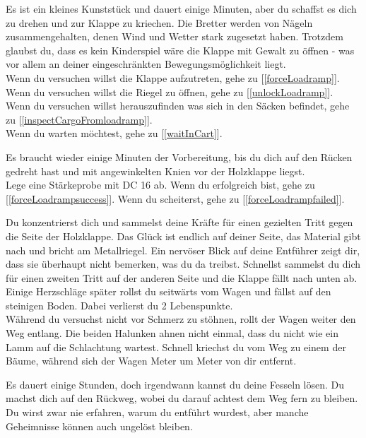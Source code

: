 
Es ist ein kleines Kunststück und dauert einige Minuten, aber du schaffst es dich zu drehen und zur Klappe zu kriechen. Die Bretter werden von Nägeln zusammengehalten, denen Wind und Wetter stark zugesetzt haben. Trotzdem glaubst du, dass es kein Kinderspiel wäre die Klappe mit Gewalt zu öffnen - was vor allem an deiner eingeschränkten Bewegungsmöglichkeit liegt.
\\Wenn du versuchen willst die Klappe aufzutreten, gehe zu [\ref{forceLoadramp}].
\\Wenn du versuchen willst die Riegel zu öffnen, gehe zu [\ref{unlockLoadramp}].
\\Wenn du versuchen willst herauszufinden was sich in den Säcken befindet, gehe zu [\ref{inspectCargoFromloadramp}].
\\Wenn du warten möchtest, gehe zu [\ref{waitInCart}].


Es braucht wieder einige Minuten der Vorbereitung, bis du dich auf den Rücken gedreht hast und mit angewinkelten Knien vor der Holzklappe liegst.\\
Lege eine Stärkeprobe mit DC 16 ab. Wenn du erfolgreich bist, gehe zu [\ref{forceLoadrampsuccess}].
Wenn du scheiterst, gehe zu [\ref{forceLoadrampfailed}].


Du konzentrierst dich und sammelst deine Kräfte für einen gezielten Tritt gegen die Seite der Holzklappe. Das Glück ist endlich auf deiner Seite, das Material gibt nach und bricht am Metallriegel. Ein nervöser Blick auf deine Entführer zeigt dir, dass sie überhaupt nicht bemerken, was du da treibst. Schnellst sammelst du dich für einen zweiten Tritt auf der anderen Seite und die Klappe fällt nach unten ab. Einige Herzschläge später rollst du seitwärts vom Wagen und fällst auf den steinigen Boden. Dabei verlierst du 2 Lebenspunkte.\\
Während du versuchst nicht vor Schmerz zu stöhnen, rollt der Wagen weiter den Weg entlang. Die beiden Halunken ahnen nicht einmal, dass du nicht wie ein Lamm auf die Schlachtung wartest. Schnell kriechst du vom Weg zu einem der Bäume, während sich der Wagen Meter um Meter von dir entfernt.

Es dauert einige Stunden, doch irgendwann kannst du deine Fesseln lösen. Du machst dich auf den Rückweg, wobei du darauf achtest dem Weg fern zu bleiben.
Du wirst zwar nie erfahren, warum du entführt wurdest, aber manche Geheimnisse können auch ungelöst bleiben.

